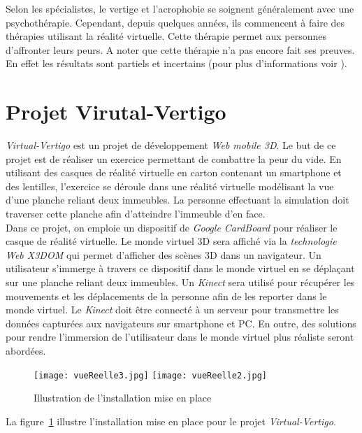 Selon les spécialistes, le vertige et l'acrophobie se soignent généralement avec une psychothérapie. Cependant, depuis quelques années, ils commencent à faire des thérapies utilisant la réalité virtuelle. Cette thérapie permet aux personnes d'affronter leurs peurs. A noter que cette thérapie n'a pas encore fait ses preuves. En effet les résultats sont partiels et incertains (pour plus d'informations voir \cite{acrophobie}).


\section{Projet Virutal-Vertigo}
\textit{Virtual-Vertigo} est un projet de développement \textit{Web mobile 3D}. Le but de ce projet est de réaliser un exercice permettant de combattre la peur du vide. En utilisant des casques de réalité virtuelle en carton contenant un \textsf{smartphone} et des lentilles, l'exercice se déroule dans une réalité virtuelle modélisant la vue d'une planche reliant deux immeubles. La personne effectuant la simulation doit traverser cette planche afin d'atteindre l'immeuble d'en face.\\

Dans ce projet, on emploie un dispositif de \textit{Google CardBoard} pour réaliser le casque de réalité virtuelle. Le monde virtuel 3D sera affiché via la \textit{technologie Web X3DOM} qui permet d'afficher des scènes 3D dans un navigateur. Un utilisateur s'immerge à travers ce dispositif dans le monde virtuel en se déplaçant sur une planche reliant deux immeubles. Un \textit{Kinect} sera utilisé pour récupérer les mouvements et les déplacements de la personne afin de les reporter dans le monde virtuel. Le \textit{Kinect} doit être connecté à un serveur pour transmettre les données capturées aux navigateurs sur \textsf{smartphone} et PC. En outre, des solutions pour rendre l'immersion de l'utilisateur dans le monde virtuel plus réaliste seront abordées.

\begin{figure}[H]
\centering
\texttt{[image: vueReelle3.jpg]}
\texttt{[image: vueReelle2.jpg]}
\caption{\label{installation} Illustration de l'installation mise en place}
\end{figure}

La figure~\ref{installation} illustre l'installation mise en place pour le projet \textit{Virtual-Vertigo}.\\

